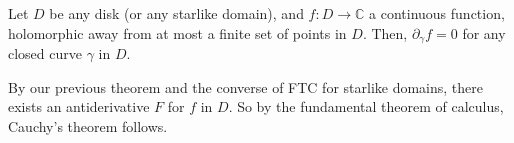 \documentclass[12pt]{article}
\begin{document}
\begin{theorem}
	Let $D$ be any disk (or any starlike domain), and $f : D \to \mathbb{C}$ a continuous function, holomorphic away from at most a finite set of points in $D$. Then, $\partial_{\gamma} f = 0$ for any closed curve $\gamma$ in $D$.
\end{theorem}

\begin{proofbox}
	By our previous theorem and the converse of FTC for starlike domains, there exists an antiderivative $F$ for $f$ in $D$. So by the fundamental theorem of calculus, Cauchy's theorem follows.
\end{proofbox}


\newpage

\printindex
\end{document}
